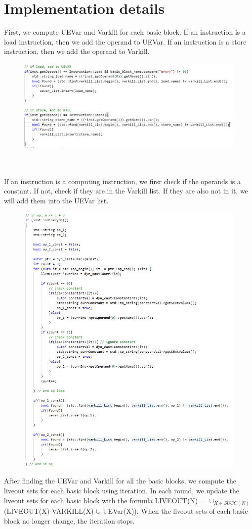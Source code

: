 \documentclass{article}[12pt]
\begin{document}
\section{Implementation details}
First, we compute UEVar and Varkill for each basic block. If an instruction is a load instruction, then we add the operand to UEVar. If an instruction is a store instruction, then we add the operand to Varkill. 

\begin{figure}[H]
	\centering
	\includegraphics[width=0.7\linewidth]{1}
\end{figure}
\\\\
If an instruction is a computing instruction, we firsr check if the operands is a constant. If not, check if they are in the Varkill list. If they are also not in it, we will add them into the UEVar list.
\begin{figure}[H]
	\centering
	\includegraphics[width=0.7\linewidth]{2}
\end{figure}
\newpage
After finding the UEVar and Varkill for all the basic blocks, we compute the liveout sets for each basic block using iteration. In each round, we update the liveout sets for each basic block with the formula LIVEOUT(N) = $ \cup_{X \in SUCC(N)}$  (LIVEOUT(X)-VARKILL(X) $\cup$ UEVar(X)). When the liveout sets of each basic block no longer change, the iteration stops.
\end{document}
